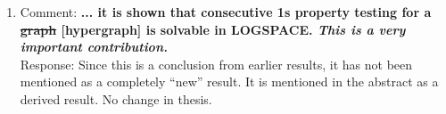 \documentclass[12pt,a4paper]{article}
\begin{document}
\begin{enumerate}
{\begin{problemdef}{\FMFT}{An in-tree partition $\bP_i$ of a hypergraph
    $\cF$ and a subtree $T_i$ of a tree $T$.}
  Compute a feasible TPL for $mub(\bP_i)$ from subtree $T_i$.
\end{problemdef}
}


\item Comment: {\bf ... it is shown that consecutive 1s property
    testing for a \sout {graph} [hypergraph] is solvable in LOGSPACE. {\em This is a very
      important contribution.}}\\
Response: Since this is a conclusion from earlier results, it has not
been mentioned as a completely ``new'' result. It is mentioned in the abstract as a
derived result. No change in thesis.
\end{enumerate}




%
\end{document}
